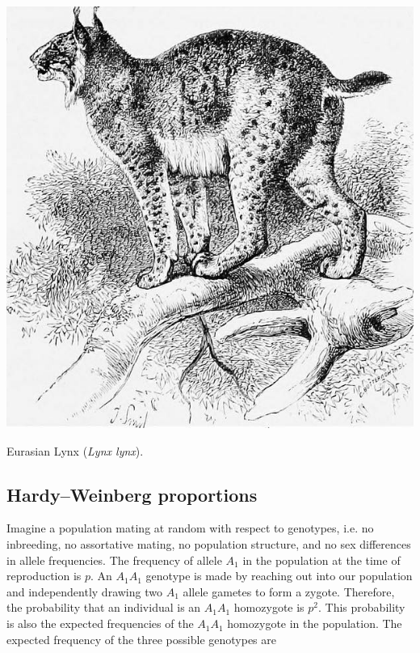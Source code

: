 {{\begin{marginfigure}[2cm]
\begin{center}
\includegraphics[width= 0.8 \textwidth]{illustration_images/alleles_genotypes/Lynx/20731949565_8a065700af_z.jpg}
\end{center}
\caption{Eurasian Lynx (\textit{Lynx lynx}). } \label{fig:Lynx}
\end{marginfigure}

\subsection{Hardy--Weinberg proportions}
Imagine a population mating at random with respect to genotypes, i.e. no
inbreeding, no assortative mating, no population structure, and no sex differences
in allele frequencies. The frequency of allele $A_1$ in the population at the
time of reproduction is $p$. An $A_1A_1$ genotype is made by reaching out into
our population and independently drawing two $A_1$ allele gametes to form a
zygote. Therefore, the probability that an individual is an $A_1A_1$ homozygote
is $p^2$. This probability is also the expected frequencies of the $A_1A_1$
homozygote in the population. The expected frequency of the three possible
genotypes are

}}
